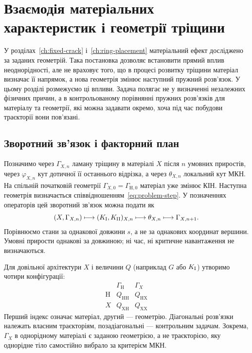 \chapter{Взаємодія матеріальних характеристик і геометрії тріщини}
\label{ch:feedback}

У розділах~\ref{ch:fixed-crack} і~\ref{ch:ring-placement} матеріальний ефект досліджено за заданих геометрій. Така постановка дозволяє встановити прямий вплив неоднорідності, але не враховує того, що в процесі розвитку тріщини матеріал визначає її напрямок, а нова геометрія змінює наступний пружний розв'язок. У цьому розділі розмежуємо ці впливи. Задача полягає не у визначенні незалежних фізичних причин, а в контрольованому порівнянні пружних розв'язків для матеріалу та геометрії, які можна задавати окремо, хоча під час побудови траєкторії вони пов'язані.

\section{Зворотний зв'язок і факторний план}
\label{sec:feedback-design}

Позначимо через $\Gamma_{X,n}$ ламану тріщину в матеріалі $X$ після $n$ умовних приростів, через $\varphi_{X,n}$ кут дотичної її останнього відрізка, а через $\theta_{X,n}$ локальний кут МКН. На спільній початковій геометрії $\Gamma_{X,0}=\Gamma_{\mathrm H,0}$ матеріал уже змінює КІН. Наступна геометрія визначається співвідношенням~\eqref{eq:problem-step}. У позначеннях операторів цей зворотний зв'язок можна подати як
\begin{equation}
 (X,\Gamma_{X,n})\longmapsto
 (K_{\mathrm{I}},K_{\mathrm{II}})_{X,n}\longmapsto\theta_{X,n}
 \longmapsto \Gamma_{X,n+1}.
 \label{eq:feedback-map}
\end{equation}
Порівнюємо стани за однакової довжини $s$, а не за однакових координат вершини. Умовні прирости однакові за довжиною; ні час, ні критичне навантаження не визначаються.

Для довільної архітектури $X$ і величини $Q$ (наприклад $G$ або $K_{\mathrm{I}}$) утворимо чотири конфігурації:
\begin{equation}
 \begin{array}{c|cc}
 &\Gamma_{\mathrm H}&\Gamma_X\\ \hline
 \mathrm H & Q_{\mathrm{HH}} & Q_{\mathrm{HX}}\\
 X & Q_{\mathrm{XH}} & Q_{\mathrm{XX}}
 \end{array}
 \label{eq:feedback-factorial}
\end{equation}
Перший індекс означає матеріал, другий --- геометрію. Діагональні розв'язки належать власним траєкторіям, позадіагональні --- контрольним задачам. Зокрема, $\Gamma_X$ в однорідному матеріалі є заданою геометрією, а не траєкторією, яку однорідне тіло самостійно вибрало за критерієм МКН.

